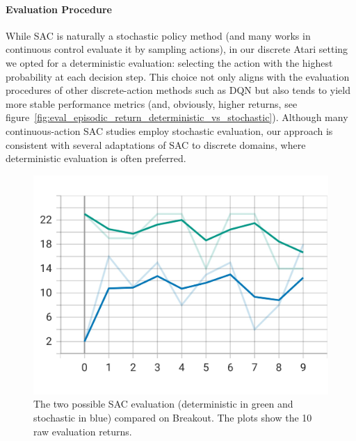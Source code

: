 \paragraph{Evaluation Procedure}
While SAC is naturally a stochastic policy method (and many works in continuous control evaluate it by sampling actions), in our discrete Atari setting we opted for a deterministic evaluation: selecting the action with the highest probability at each decision step. This choice not only aligns with the evaluation procedures of other discrete-action methods such as DQN but also tends to yield more stable performance metrics (and, obviously, higher returns, see figure~\vref{fig:eval_episodic_return_deterministic_vs_stochastic}). Although many continuous-action SAC studies employ stochastic evaluation, our approach is consistent with several adaptations of SAC to discrete domains, where deterministic evaluation is often preferred.

\begin{figure}
	\centering
	\includegraphics[width=.5\textwidth]{figures/sac/png/eval_episodic_return_deterministic_vs_stochastic.jpeg}
	\caption{The two possible SAC evaluation (deterministic in green and stochastic in blue) compared on Breakout. The plots show the 10 raw evaluation returns.}
	\label{fig:eval_episodic_return_deterministic_vs_stochastic}
\end{figure}

